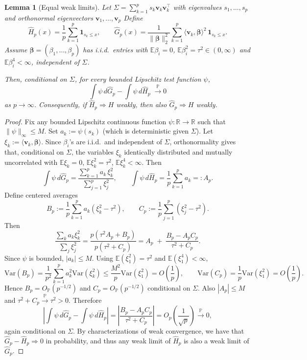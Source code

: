 \documentclass[10pt,a4paper]{amsart}
\newtheorem{lemma}{Lemma}
\newcommand{\R}{\mathbb{R}}
\newcommand{\Var}{\mathrm{Var}}
\newcommand{\bSigma}{ { \Sigma} }
\def \bbeta{\pmb{\beta}}
\newcommand{\ee}{\mathbb{E}}
\renewcommand{\hat}{\widehat}
\begin{document}
\begin{lemma}[Equal weak limits]
\label{lem:same-weak-limits}
Let $\bSigma=\sum_{k=1}^p s_k \boldsymbol v_k \boldsymbol v_k^\top$ with eigenvalues $s_1,\dots,s_p$ and
orthonormal eigenvectors $\boldsymbol v_1,\dots,\boldsymbol v_p$
Define
\[
  \hat H_p(x)=\frac{1}{p}\sum_{k=1}^p \mathbf 1_{s_k\le x},\qquad
  \hat G_p(x)=\frac{1}{\|\bbeta\|_2^2}\sum_{k=1}^p \langle \boldsymbol  v_k,\bbeta\rangle^2\,\mathbf 1_{s_k\le x}.
\]
Assume $\bbeta=(\beta_1,\dots,\beta_p)$ has i.i.d.\ entries with $\ee\beta_i=0$,
$\ee\beta_i^2=\tau^2 \in(0,\infty)$ and $\ee\beta_i^4<\infty$, independent of $\bSigma$.

Then, conditional on $\bSigma$, for every bounded Lipschitz test function $\psi$,
\[
  \int \psi\, d\hat G_p - \int \psi\, d\hat H_p \;\xrightarrow{\mathbb{P}} 0
\]
as $p \rightarrow \infty$. Consequently, if $\hat H_p \Rightarrow H$ weakly, then also $\hat G_p \Rightarrow H$ weakly.
\end{lemma}

\begin{proof}
Fix any bounded Lipschitz continuous function $\psi:\R\to\R$ such that $\|\psi\|_\infty \le M$. Set $a_k:=\psi(s_k)$ (which is deterministic given $\bSigma$).
Let $\xi_k:=\langle \boldsymbol  v_k,\bbeta\rangle$. Since $\beta_i$'s are i.i.d.\ and independent of $\bSigma$,
orthonormality gives that, conditional on $\bSigma$, the variables $\xi_k$ identically distributed and mutually uncorrelated with
$\ee\xi_k=0$, $\ee\xi_k^2=\tau^2$, $\ee\xi_k^4<\infty$. Then
\[
  \int \psi\, d\hat G_p=\frac{\sum_{k=1}^p a_k\,\xi_k^2}{\sum_{j=1}^p \xi_j^2},
  \qquad
  \int \psi\, d\hat H_p=\frac{1}{p}\sum_{k=1}^p a_k=:A_p.
\]
Define centered averages
\[
  B_p:=\frac{1}{p}\sum_{k=1}^p a_k(\xi_k^2-\tau^2),\qquad
  C_p:=\frac{1}{p}\sum_{j=1}^p (\xi_j^2-\tau^2).
\]
Then
\[
  \frac{\sum_k a_k \xi_k^2}{\sum_j \xi_j^2}
  =\frac{p(\tau^2 A_p + B_p)}{p(\tau^2+C_p)}
  = A_p \;+\; \frac{B_p - A_p C_p}{\tau^2 + C_p}.
\]
Since $\psi$ is bounded, $|a_k|\le M$. Using $\ee(\xi_1^2)=\tau^2$ and $\ee(\xi_1^4)<\infty$,
\[
  \Var(B_p)=\frac{1}{p^2}\sum_{k=1}^p a_k^2\Var(\xi_k^2)\le \frac{M^2}{p}\Var(\xi_1^2)=O\!\left(\frac{1}{p}\right),
  \qquad
  \Var(C_p)=\frac{1}{p}\Var(\xi_1^2)=O\!\left(\frac{1}{p}\right).
\]
Hence $B_p=O_{\mathbb{P}}(p^{-1/2})$ and $C_p=O_{\mathbb{P}}(p^{-1/2})$ conditional on $\bSigma$.
Also $|A_p|\le M$ and $\tau^2+C_p\overset{\mathbb{P}}{\to}\tau^2>0$. Therefore
\[
  \left|\int \psi\, d\hat G_p - \int \psi\, d\hat H_p\right|
  =\left|\frac{B_p - A_p C_p}{\tau^2 + C_p}\right|
  =O_p\!\left(\frac{1}{\sqrt{p}}\right)\xrightarrow{\mathbb{P}}0,
\]
again conditional on $\bSigma$. By characterizations of weak convergence, we have that $\hat G_p-\hat H_p\Rightarrow 0$ in probability, and thus any weak limit
of $\hat H_p$ is also a weak limit of $\hat G_p$.
\end{proof}
\end{document}
